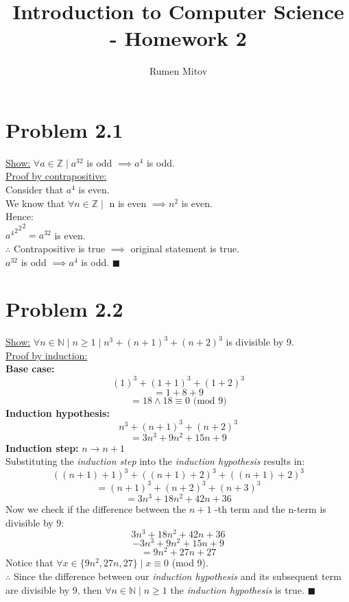 \documentclass{article}
\title{\vspace{-2cm}Introduction to Computer Science - Homework 2}
\author{Rumen Mitov}
\begin{document}
\maketitle

\section*{Problem 2.1}
\underline{Show:} $\forall a \in \mathbb{Z} \mid a^{32}$ is odd $\implies a^4$ is odd. \\
\underline{Proof by contrapositive:} \\
Consider that $a^4$ is even. \\
We know that $\forall n \in \mathbb{Z} \mid$ n is even $\implies n^2$ is even. \\
Hence: \\
${{{a^4}^2}^2}^2 = a^{32}$ is even. \\
$\therefore$ Contrapositive is true $\implies$ original statement is true. \\
$a^{32}$ is odd $\implies a^4$ is odd. $\blacksquare$ \\

\section*{Problem 2.2}
\underline{Show:} $\forall n \in \mathbb{N} \mid n \geq 1 \mid n^3 + (n + 1)^3 + (n + 2)^3$ is divisible by 9. \\
\underline{Proof by induction:} \\
\textbf{Base case:} \\
\[
    (1)^3 + (1 + 1)^3 + (1 + 2)^3  
\]
\[
    = 1 + 8 + 9
\]
\[
    = 18 \land 18 \equiv 0 \text{ (mod 9)}
\]
\textbf{Induction hypothesis:} \\
\[
    n^3 + (n + 1)^3 + (n + 2)^3
\]
\[
    = 3n^3 + 9n^2 + 15n + 9
\]
\textbf{Induction step:} $n \to n + 1$ \\
Substituting the \textit{induction step} into the \textit{induction hypothesis} results in: \\
\[
    ((n + 1) + 1)^3 + ((n + 1) + 2)^3 + ((n + 1) + 2)^3
\]
\[
    = (n + 1)^3 + (n + 2)^3 + (n + 3)^3
\]
\[
    = 3n^3 + 18n^2 + 42n + 36
\]
Now we check if the difference between the $n + 1$ -th term and the n-term is divisible by 9:
\[
    3n^3 + 18n^2 + 42n + 36
\]
\[
    - 3n^3 + 9n^2 + 15n + 9
\]
\[
    = 9n^2 + 27n + 27
\]
Notice that $\forall x \in \{9n^2, 27n, 27\} \mid x \equiv 0$ (mod 9). \\
$\therefore$ Since the difference between our \textit{induction hypothesis} and its subsequent term
are divisible by 9, then $\forall n \in \mathbb{N} \mid n \geq 1$ the \textit{induction 
hypothesis} is true. $\blacksquare$
\end{document}

